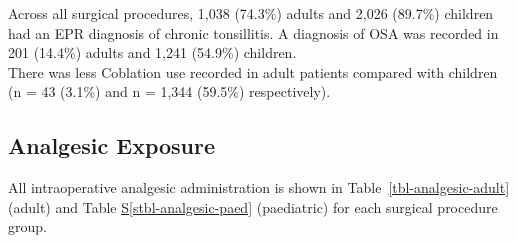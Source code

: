 \documentclass[
  letterpaper,
  DIV=11,
  numbers=noendperiod]{scrreprt}
\newcommand*\quartostblref[1]{Table \hyperref[#1]{S\ref{#1}}}
\begin{document}
Across all surgical procedures, 1,038 (74.3\%) adults and 2,026 (89.7\%)
children had an EPR diagnosis of chronic tonsillitis. A diagnosis of OSA
was recorded in 201 (14.4\%) adults and 1,241 (54.9\%) children.\\
There was less Coblation use recorded in adult patients compared with
children (n = 43 (3.1\%) and n = 1,344 (59.5\%) respectively).

\subsection{Analgesic Exposure}\label{analgesic-exposure}

All intraoperative analgesic administration is shown in
Table~\ref{tbl-analgesic-adult} (adult) and
\quartostblref{stbl-analgesic-paed} (paediatric) for each surgical
procedure group.
\end{document}
